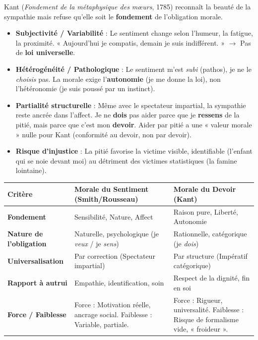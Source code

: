 \documentclass[11pt]{article}
\begin{document}
Kant (\emph{Fondement de la métaphysique des mœurs}, 1785) reconnaît la beauté de la sympathie mais refuse qu'elle soit le \textbf{fondement} de l'obligation morale.

\begin{attention}
\begin{itemize}
    \item \textbf{Subjectivité / Variabilité} : Le sentiment change selon l'humeur, la fatigue, la proximité. « Aujourd'hui je compatis, demain je suis indifférent. » $\rightarrow$ Pas de \textbf{loi universelle}.
    \item \textbf{Hétérogénéité / Pathologique} : Le sentiment m'est \emph{subi} (pathos), je ne le \emph{choisis} pas. La morale exige l'\textbf{autonomie} (je me donne la loi), non l'hétéronomie (je suis poussé par un instinct).
    \item \textbf{Partialité structurelle} : Même avec le spectateur impartial, la sympathie reste ancrée dans l'affect. Je ne \textbf{dois} pas aider parce que je \textbf{ressens} de la pitié, mais parce que c'est mon \textbf{devoir}. Aider par pitié a une « valeur morale » nulle pour Kant (conformité au devoir, non par devoir).
    \item \textbf{Risque d'injustice} : La pitié favorise la victime visible, identifiable (l'enfant qui se noie devant moi) au détriment des victimes statistiques (la famine lointaine).
\end{itemize}
\end{attention}

\begin{aretenir}
\begin{center}
\begin{tabularx}{\linewidth}{|l|X|X|}\hline
\textbf{Critère} & \textbf{Morale du Sentiment (Smith/Rousseau)} & \textbf{Morale du Devoir (Kant)} \\ \hline
\textbf{Fondement} & Sensibilité, Nature, Affect & Raison pure, Liberté, Autonomie \\ \hline
\textbf{Nature de l'obligation} & Naturelle, psychologique (je \emph{veux} / je \emph{sens}) & Rationnelle, catégorique (je \emph{dois}) \\ \hline
\textbf{Universalisation} & Par correction (Spectateur impartial) & Par structure (Impératif catégorique) \\ \hline
\textbf{Rapport à autrui} & Empathie, identification, soin & Respect de la dignité, fin en soi \\ \hline
\textbf{Force / Faiblesse} & Force : Motivation réelle, ancrage social. Faiblesse : Variable, partiale. & Force : Rigueur, universalité. Faiblesse : Risque de formalisme vide, « froideur ». \\ \hline
\end{tabularx}
\end{center}
\end{aretenir}
\end{document}
